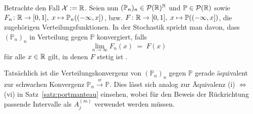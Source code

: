 \documentclass[../thesis/thesis.tex]{subfiles}
\begin{document}
	\begin{Bemerkung}[Verteilungskonvergenz]
		Betrachte den Fall $\mathcal{X} := \mathbb{R}$. Seien nun $(\mathbb{P}_n)_n \in \mathcal{P}(\mathbb{R})^{\mathbb{N}}$ und $\mathbb{P} \in \mathcal{P}(\mathbb{R})$ sowie $F_n \colon \mathbb{R} \to [0, 1], \; x \mapsto \mathbb{P}_n((-\infty, x]) $, bzw. $F \colon \mathbb{R} \to [0, 1], \; x \mapsto \mathbb{P}((-\infty, x]) $, die zugehörigen Verteilungsfunktionen. In der Stochastik spricht man davon, dass $(\mathbb{P}_n)_n$ in Verteilung gegen $\mathbb{P}$ konvergiert, falls 
		\[ \lim_{n \to \infty} F_n(x) \; = \; F(x) \]
		für alle $x \in \mathbb{R}$ gilt, in denen $F$ stetig ist \cite[Definition 6.1]{Henze.2016}. 
		
		Tatsächlich ist die Verteilungskonvergenz von $(\mathbb{P}_n)_n$ gegen $\mathbb{P}$ gerade äquivalent zur schwachen Konvergenz $\mathbb{P}_n \xrightarrow{w} \mathbb{P}$. Dies lässt sich analog zur Äquivalenz (i) $\Leftrightarrow$ (vi) in Satz~\ref{satz:portmanteau} einsehen, wobei für den Beweis der Rückrichtung passende Intervalle als $A_j^{(m)}$ verwendet werden müssen.
	\end{Bemerkung}
	
\end{document}
